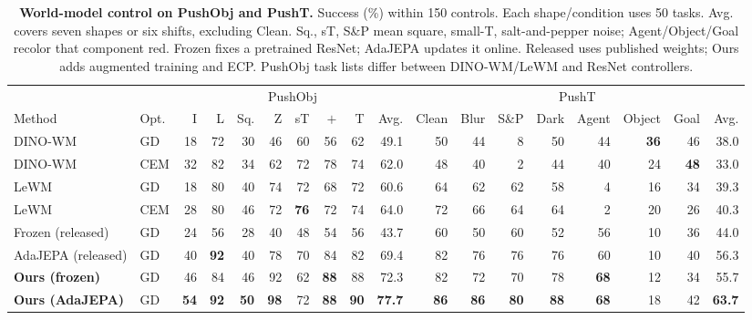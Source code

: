 \begin{table}[t]
\centering
\caption{\textbf{World-model control on PushObj and PushT.} Success (\%) within 150 controls. Each shape/condition uses 50 tasks. Avg. covers seven shapes or six shifts, excluding Clean. Sq., sT, S\&P mean square, small-T, salt-and-pepper noise; Agent/Object/Goal recolor that component red. Frozen fixes a pretrained ResNet; AdaJEPA updates it online. Released uses published weights; Ours adds augmented training and ECP. PushObj task lists differ between DINO-WM/LeWM and ResNet controllers.}
\label{tab:main}
\small
\setlength{\tabcolsep}{2pt}
\begin{tabular*}{\textwidth}{@{\extracolsep{\fill}}ll*{16}{r}@{}}
\toprule
& &\multicolumn{8}{c}{PushObj}&\multicolumn{8}{c}{PushT}\\
\cmidrule(lr){3-10}\cmidrule(lr){11-18}
Method & Opt. & I & L & Sq. & Z & sT & $+$ & T & Avg. & Clean & Blur & S\&P & Dark & Agent & Object & Goal & Avg.\\
\midrule
DINO-WM~\cite{zhou2025dinowm} & GD & 18 & 72 & 30 & 46 & 60 & 56 & 62 & 49.1 & 50 & 44 & 8 & 50 & 44 & \textbf{36} & 46 & 38.0\\
DINO-WM~\cite{zhou2025dinowm} & CEM & 32 & 82 & 34 & 62 & 72 & 78 & 74 & 62.0 & 48 & 40 & 2 & 44 & 40 & 24 & \textbf{48} & 33.0\\
LeWM~\cite{maes2026lewm} & GD & 18 & 80 & 40 & 74 & 72 & 68 & 72 & 60.6 & 64 & 62 & 62 & 58 & 4 & 16 & 34 & 39.3\\
LeWM~\cite{maes2026lewm} & CEM & 28 & 80 & 46 & 72 & \textbf{76} & 72 & 74 & 64.0 & 72 & 66 & 64 & 64 & 2 & 20 & 26 & 40.3\\
Frozen (released) & GD & 24 & 56 & 28 & 40 & 48 & 54 & 56 & 43.7 & 60 & 50 & 60 & 52 & 56 & 10 & 36 & 44.0\\
AdaJEPA (released) & GD & 40 & \textbf{92} & 40 & 78 & 70 & 84 & 82 & 69.4 & 82 & 76 & 76 & 76 & 60 & 10 & 40 & 56.3\\
\midrule
\textbf{Ours (frozen)} & GD & 46 & 84 & 46 & 92 & 62 & \textbf{88} & 88 & 72.3 & 82 & 72 & 70 & 78 & \textbf{68} & 12 & 34 & 55.7\\
\textbf{Ours (AdaJEPA)} & GD & \textbf{54} & \textbf{92} & \textbf{50} & \textbf{98} & 72 & \textbf{88} & \textbf{90} & \textbf{77.7} & \textbf{86} & \textbf{86} & \textbf{80} & \textbf{88} & \textbf{68} & 18 & 42 & \textbf{63.7}\\
\bottomrule
\end{tabular*}
\end{table}
